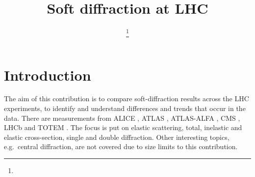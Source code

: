 \documentclass{webofc}
\begin{document}
\title{Soft diffraction at LHC}

\author{%
	 \fnsep\thanks{}
}



\maketitle


\section{Introduction}
\label{s:intro}

The aim of this contribution is to compare soft-diffraction results across the LHC experiments, to identify and understand differences and trends that occur in the data. There are measurements from ALICE \cite{alice}, ATLAS \cite{atlas}, ATLAS-ALFA \cite{alfa-si-el-7tev}, CMS \cite{cms}, LHCb \cite{lhcb} and TOTEM \cite{totem}. The focus is put on elastic scattering, total, inelastic and elastic cross-section, single and double diffraction. Other interesting topics, e.g.~central diffraction, are not covered due to size limits to this contribution.


\end{document}
